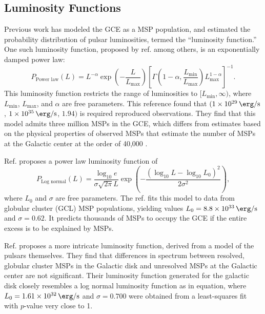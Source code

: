 \documentclass[a4paper,11pt]{article}
\newcommand{\parens}[1]{\left(#1\right)}
\newcommand{\brackets}[1]{\left[#1\right]}
\newcommand{\expp}[1]{\exp \parens{#1}}
\newcommand{\comment}[1]{\emph{\color{red}{#1}}}
\begin{document}
\subsection{Luminosity Functions}
\label{sec:lum-funcs}
Previous work has modeled the GCE as a MSP population, and estimated the probability distribution of pulsar luminosities, termed the ``luminosity function.'' One such luminosity function, proposed by ref. \cite{Zhong:2019ycb} among others, is an exponentially damped power law:
\begin{equation}
    P_\text{Power law}(L) = L^{-\alpha} \expp{-\frac{L}{L_\text{max}}}\brackets{\Gamma\parens{1-\alpha, \frac{L_\text{min}}{L_\text{max}}}L_\text{max}^{1-\alpha}}^{-1}.
    \label{eqn:power-law}
\end{equation}
This luminosity function restricts the range of luminosities to $[L_\text{min}, \infty)$, where $L_\text{min}$, $L_\text{max}$, and $\alpha$ are free parameters. \comment{The following should probably be moved to the introduction once I write it, where Fermilab's research is described.} This reference found that $(\SI{1e29}{\erg\per\second}$, $ \SI{1e35}{\erg\per\second}$, $1.94)$ is required reproduced observations. They find that this model admits three million MSPs in the GCE, which differs from estimates based on the physical properties of observed MSPs that estimate the number of MSPs at the Galactic center at the order of 40,000 \cite{citation_needed}.

Ref. \cite{osti_1305131} proposes a power law luminosity function of
\begin{equation}
    P_\text{Log normal}(L)= \frac{\log_{10} e}{\sigma \sqrt{2\pi} L}\expp{-\frac{\parens{\log_{10} L - \log_{10} L_0}^2}{2\sigma^2}},
    \label{eqn:log-normal}
\end{equation}
where $L_0$ and $\sigma$ are free parameters. The ref. fits this model to data from globular cluster (GCL) MSP populations, yielding values $L_0 = \SI{8.8e33}{\erg\per\second}$ and $\sigma=0.62$. It predicts thousands of MSPs to occupy the GCE if the entire excess is to be explained by MSPs.

Ref. \cite{Ploeg:2020jeh} proposes a more intricate luminosity function, derived from a model of the pulsars themselves. They find that differences in spectrum between resolved, globular cluster MSPs in the Galactic disk and unresolved MSPs at the Galactic center are not significant. Their luminosity function generated for the galactic disk closely resembles a log normal luminosity function as in equation, where $L_0 = \SI{1.61e+32}{\erg\per\second}$ and $\sigma=0.700$ were obtained from a least-squares fit with $p$-value very close to 1.
\end{document}

